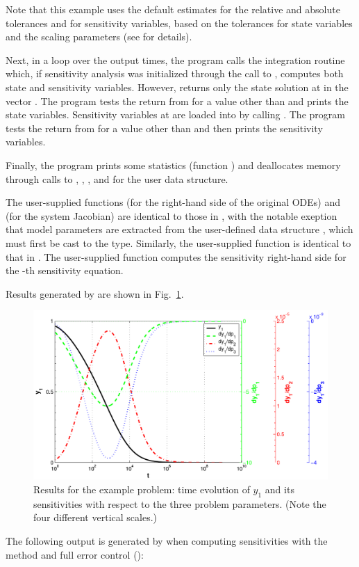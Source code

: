 Note that this example uses the default estimates for the relative and absolute tolerances 
 and  for sensitivity variables, based on the tolerances for state 
variables and the scaling parameters  (see  for details).

Next, in a loop over the  output times, the program calls the integration
routine  which, if sensitivity analysis was initialized through the call
to , computes both state and sensitivity variables. However,
 returns only the state solution at  in the vector .
The program tests the return from  for a value other than  and
prints the state variables.
Sensitivity variables at  are loaded into  by calling .
The program tests the return from  for a value other than  
and then prints the sensitivity variables.

Finally, the program prints some statistics (function ) 
and deallocates memory through calls
to , , 
, and  for the user data structure.

The user-supplied functions  (for the right-hand side of the original ODEs) and
 (for the system Jacobian) are identical to those in ,
with the notable exeption that model parameters are extracted from the user-defined
data structure , which must first be cast to the  type.
Similarly, the user-supplied function  is identical to that in
.  The user-supplied function  computes the
sensitivity right-hand side for the -th sensitivity equation.

Results generated by  are shown in
Fig.~\ref{f:cvsRoberts_FSA_dns}. 
\begin{figure}
  {\centerline{\includegraphics[width=\textwidth]{cvsfwddenx}}}
  \caption{Results for the  example problem:
    time evolution of $y_1$ and its sensitivities with respect to the
    three problem parameters.  (Note the four different vertical scales.)}
  \label{f:cvsRoberts_FSA_dns}
\end{figure}
The following output is generated by  when computing
sensitivities with the  method and full error
control ():

